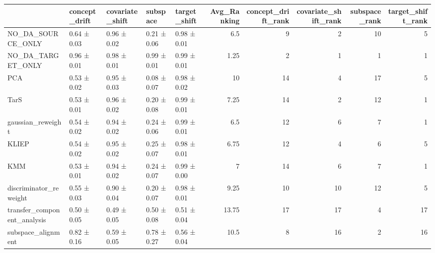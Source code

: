 \begin{tabular}{lllllrrrrr}
\hline
                              & concept\_drift   & covariate\_shift   & subspace    & target\_shift   &   Avg\_Ranking &   concept\_drift\_rank &   covariate\_shift\_rank &   subspace\_rank &   target\_shift\_rank \\
\hline
 NO\_DA\_SOURCE\_ONLY            & 0.64 ± 0.03     & 0.96 ± 0.02       & 0.21 ± 0.06 & 0.98 ± 0.01    &          6.5  &                    9 &                      2 &              10 &                   5 \\
 NO\_DA\_TARGET\_ONLY            & 0.96 ± 0.01     & 0.98 ± 0.01       & 0.99 ± 0.01 & 0.99 ± 0.01    &          1.25 &                    2 &                      1 &               1 &                   1 \\
 PCA                          & 0.53 ± 0.02     & 0.95 ± 0.03       & 0.08 ± 0.07 & 0.98 ± 0.02    &         10    &                   14 &                      4 &              17 &                   5 \\
 TarS                         & 0.53 ± 0.01     & 0.96 ± 0.02       & 0.20 ± 0.08 & 0.99 ± 0.01    &          7.25 &                   14 &                      2 &              12 &                   1 \\
 gaussian\_reweight            & 0.54 ± 0.02     & 0.94 ± 0.02       & 0.24 ± 0.06 & 0.99 ± 0.01    &          6.5  &                   12 &                      6 &               7 &                   1 \\
 KLIEP                        & 0.54 ± 0.02     & 0.95 ± 0.02       & 0.25 ± 0.07 & 0.98 ± 0.01    &          6.75 &                   12 &                      4 &               6 &                   5 \\
 KMM                          & 0.53 ± 0.01     & 0.94 ± 0.02       & 0.24 ± 0.07 & 0.99 ± 0.00    &          7    &                   14 &                      6 &               7 &                   1 \\
 discriminator\_reweight       & 0.55 ± 0.03     & 0.90 ± 0.04       & 0.20 ± 0.07 & 0.98 ± 0.01    &          9.25 &                   10 &                     10 &              12 &                   5 \\
 transfer\_component\_analysis  & 0.50 ± 0.05     & 0.49 ± 0.05       & 0.50 ± 0.08 & 0.51 ± 0.04    &         13.75 &                   17 &                     17 &               4 &                  17 \\
 subspace\_alignment           & 0.82 ± 0.16     & 0.59 ± 0.05       & 0.78 ± 0.27 & 0.56 ± 0.04    &         10.5  &                    8 &                     16 &               2 &                  16 \\

\end{tabular}
